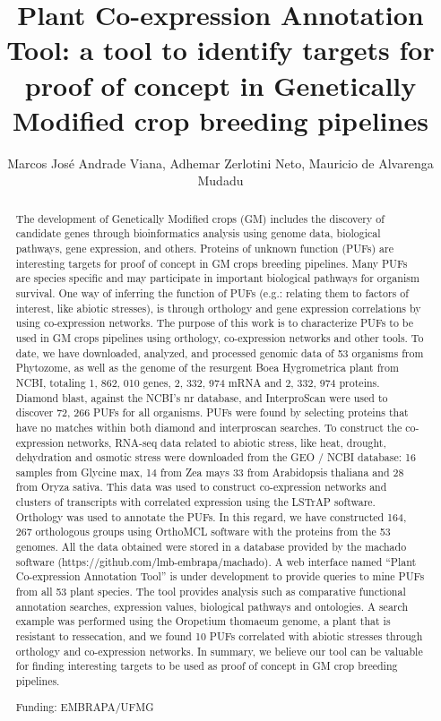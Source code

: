 \documentclass[twoside]{article}
\title{\vspace{-15mm}\fontsize{24pt}{10pt}\selectfont\textbf{ Plant Co-expression Annotation Tool: a tool to identify targets for proof of concept in Genetically Modified crop breeding pipelines }} %
\author{ Marcos Jos\'e Andrade Viana, Adhemar Zerlotini Neto, Mauricio de Alvarenga Mudadu }
\affil{ UFMG/EMBRAPA }
\date{}
\begin{document}
  
  
  \maketitle %
  
  
  \thispagestyle{fancy} %
  
  
  \begin{abstract}
  The development of Genetically Modified crops (GM) includes the discovery of candidate genes through bioinformatics analysis using genome data,  biological pathways,  gene expression,  and others. Proteins of unknown function (PUFs) are interesting targets for proof of concept in GM crops breeding pipelines. Many PUFs are species specific and may participate in important biological pathways for organism survival. One way of inferring the function of PUFs (e.g.: relating them to factors of interest,  like abiotic stresses),  is through orthology and gene expression correlations by using co-expression networks. The purpose of this work is to characterize PUFs to be used in GM crops pipelines using orthology,  co-expression networks and other tools. To date,  we have downloaded,  analyzed,  and processed genomic data of 53 organisms from Phytozome,  as well as the genome of the resurgent Boea Hygrometrica plant from NCBI,  totaling 1, 862, 010 genes,  2, 332, 974 mRNA and 2, 332, 974 proteins. Diamond blast,  against the NCBI’s nr database,  and InterproScan were used to discover 72, 266 PUFs for all organisms. PUFs were found by selecting proteins that have no matches within both diamond and interproscan searches. To construct the co-expression networks,  RNA-seq data related to abiotic stress,  like heat,  drought,  dehydration and osmotic stress were downloaded from the GEO / NCBI database: 16 samples from Glycine max,   14 from Zea mays  33 from Arabidopsis thaliana and 28 from Oryza sativa. This data was used to construct co-expression networks and clusters of transcripts with correlated expression using the LSTrAP software. Orthology was used to annotate the PUFs. In this regard,  we have constructed 164, 267 orthologous groups using OrthoMCL software with the proteins from the 53 genomes. All the data obtained were stored in a database provided by the machado software (https://github.com/lmb-embrapa/machado). A web interface named “Plant Co-expression Annotation Tool” is under development to provide queries to mine PUFs from all 53 plant species. The tool provides analysis such as comparative functional annotation searches,  expression values,  biological pathways and ontologies. A search example was performed using the Oropetium thomaeum genome,  a plant that is resistant to ressecation,  and we found 10 PUFs correlated with abiotic stresses through orthology and co-expression networks. In summary,  we believe our tool can be valuable for finding interesting targets to be used as proof of concept in GM crop breeding pipelines.
  
  Funding: EMBRAPA/UFMG \\ 
  \end{abstract}
  
\end{document}

